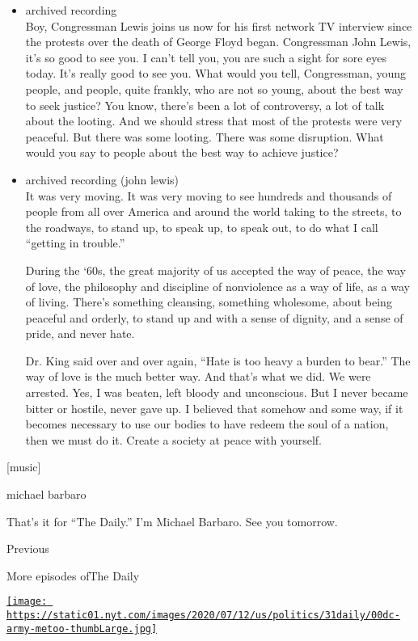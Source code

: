 \begin{itemize}
\item
  archived recording\\
  Boy, Congressman Lewis joins us now for his first network TV interview
  since the protests over the death of George Floyd began. Congressman
  John Lewis, it's so good to see you. I can't tell you, you are such a
  sight for sore eyes today. It's really good to see you. What would you
  tell, Congressman, young people, and people, quite frankly, who are
  not so young, about the best way to seek justice? You know, there's
  been a lot of controversy, a lot of talk about the looting. And we
  should stress that most of the protests were very peaceful. But there
  was some looting. There was some disruption. What would you say to
  people about the best way to achieve justice?
\item
  archived recording (john lewis)\\
  It was very moving. It was very moving to see hundreds and thousands
  of people from all over America and around the world taking to the
  streets, to the roadways, to stand up, to speak up, to speak out, to
  do what I call ``getting in trouble.''

  During the `60s, the great majority of us accepted the way of peace,
  the way of love, the philosophy and discipline of nonviolence as a way
  of life, as a way of living. There's something cleansing, something
  wholesome, about being peaceful and orderly, to stand up and with a
  sense of dignity, and a sense of pride, and never hate.

  Dr. King said over and over again, ``Hate is too heavy a burden to
  bear.'' The way of love is the much better way. And that's what we
  did. We were arrested. Yes, I was beaten, left bloody and unconscious.
  But I never became bitter or hostile, never gave up. I believed that
  somehow and some way, if it becomes necessary to use our bodies to
  have redeem the soul of a nation, then we must do it. Create a society
  at peace with yourself.
\end{itemize}

{[}music{]}

michael barbaro

That's it for ``The Daily.'' I'm Michael Barbaro. See you tomorrow.

Previous

More episodes ofThe Daily

\href{https://www.nytimes.com/2020/07/31/podcasts/the-daily/vanessa-guillen-military-metoo.html?action=click\&module=audio-series-bar\&region=header\&pgtype=Article}{\texttt{[image: https://static01.nyt.com/images/2020/07/12/us/politics/31daily/00dc-army-metoo-thumbLarge.jpg]}}

